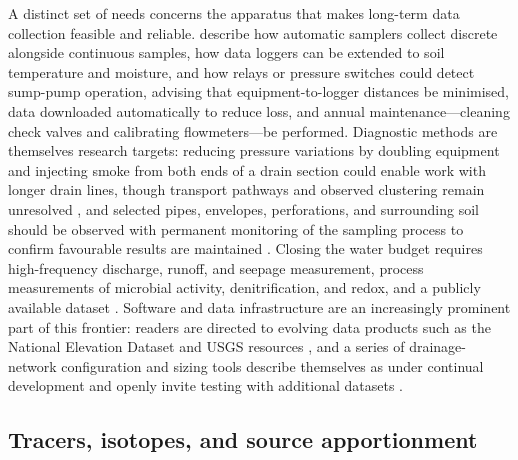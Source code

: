 A distinct set of needs concerns the apparatus that makes long-term data
collection feasible and reliable. \textcite{Kanwar1999} describe how
automatic samplers collect discrete alongside continuous samples, how data
loggers can be extended to soil temperature and moisture, and how relays or
pressure switches could detect sump-pump operation, advising that
equipment-to-logger distances be minimised, data downloaded automatically to
reduce loss, and annual maintenance---cleaning check valves and calibrating
flowmeters---be performed. Diagnostic methods are themselves research
targets: reducing pressure variations by doubling equipment and injecting
smoke from both ends of a drain section could enable work with longer drain
lines, though transport pathways and observed clustering remain unresolved
\parencite{Petersen2012}, and selected pipes, envelopes, perforations, and
surrounding soil should be observed with permanent monitoring of the
sampling process to confirm favourable results are maintained
\parencite{MartínezBeltrán2007}. Closing the water budget requires
high-frequency discharge, runoff, and seepage measurement, process
measurements of microbial activity, denitrification, and redox, and a
publicly available dataset \parencite{Frankenberger2024}. Software and data
infrastructure are an increasingly prominent part of this frontier:
readers are directed to evolving data products such as the National
Elevation Dataset and USGS resources \parencite{Shedekar2018}, and a series
of drainage-network configuration and sizing tools describe themselves as
under continual development and openly invite testing with additional
datasets \parencite{Falasy2025,Falasy2025b,Falasy2024}.

\subsection{Tracers, isotopes, and source apportionment}

